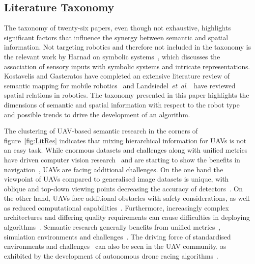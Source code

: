 \documentclass[twocolumn,letterpaper]{IEEEAerospaceCLS}  %
\newcommand{\abbreviation}[1]{\emph{#1}.}
\newcommand{\etal}{\abbreviation{et~al}}
\begin{document}
\subsection{Literature Taxonomy} \label{ssec:ConclLit}
The taxonomy of twenty-six papers, even though not exhaustive, highlights significant factors that influence the synergy between semantic and spatial information. Not targeting robotics and therefore not included in the taxonomy is the relevant work by Harnad on symbolic systems~\cite{harnad_symbol_1990}, which discusses the association of sensory inputs with symbolic systems and intricate representations. Kostavelis and Gasteratos have completed an extensive literature review of semantic mapping for mobile robotics~\cite{kostavelis_semantic_2015} and Landsiedel~\etal~\cite{landsiedel_review_2017} have reviewed spatial relations in robotics. The taxonomy presented in this paper highlights the dimensions of semantic and spatial information with respect to the robot type and possible trends to drive the development of an algorithm.

The clustering of UAV-based semantic research in the corners of figure~\ref{fig:LitRes} indicates that mixing hierarchical information for UAVs is not an easy task. While enormous datasets and challenges along with unified metrics have driven computer vision research~\cite{alom_history_2018,corke_what_2020} and are starting to show the benefits in navigation~\cite{anderson_evaluation_2018,chaplot_object_2020}, UAVs are facing additional challenges.
On the one hand the viewpoint of UAVs compared to generalised image datasets is unique, with oblique and top-down viewing points decreasing the accuracy of detectors~\cite{richardwebster_psyphy:_2019}. On the other hand, UAVs face additional obstacles with safety considerations, as well as reduced computational capabilities~\cite{boroujerdian_mavbench_2018,mandel_method_2020}. Furthermore, increasingly complex architectures and differing quality requirements can cause difficulties in deploying algorithms~\cite{cervera_try_2019,malatova_how_2020}. 
Semantic research generally benefits from unified metrics~\cite{anderson_evaluation_2018}, simulation environments and challenges~\cite{chaplot_object_2020,yang_visual_2018}. The driving force of standardised environments and challenges~\cite{corke_what_2020} can also be seen in the UAV community, as exhibited by the development of autonomous drone racing algorithms~\cite{moon_challenges_2019}.
\end{document}
